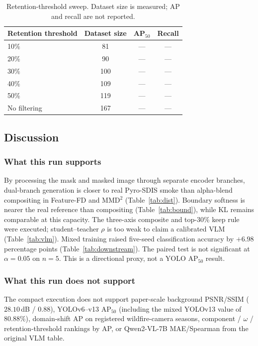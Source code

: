 \begin{table}[!t]
\centering
\caption{Retention-threshold sweep. Dataset size is measured; AP and
recall are not reported.}
\label{tab:filter}
\begin{tabular}{lccc}
\hline
Retention threshold & Dataset size & AP\(_{50}\) & Recall \\
\hline
10\% & 81 & --- & --- \\
20\% & 90 & --- & --- \\
30\% & 100 & --- & --- \\
40\% & 109 & --- & --- \\
50\% & 119 & --- & --- \\
No filtering & 167 & --- & --- \\
\hline
\end{tabular}
\end{table}

\subsection{Discussion}
\label{sec:results-disc}

\subsubsection{What this run supports}
By processing the mask and masked image through separate encoder
branches, dual-branch generation is closer to real Pyro-SDIS smoke than
alpha-blend compositing in Feature-FD and MMD\(^2\)
(Table~\ref{tab:dist}). Boundary softness is nearer the real reference
than compositing (Table~\ref{tab:bound}), while KL remains comparable at
this capacity. The three-axis composite and top-30\% keep rule were
executed; student--teacher \(\rho\) is too weak to claim a calibrated VLM
(Table~\ref{tab:vlm}). Mixed training raised five-seed classification
accuracy by \(+6.98\) percentage points (Table~\ref{tab:downstream}). The
paired test is not significant at \(\alpha=0.05\) on \(n=5\). This is a
directional proxy, not a YOLO \(\mathrm{AP}_{50}\) result.

\subsubsection{What this run does not support}
The compact execution does not support paper-scale background PSNR/SSIM
(\(28.10\)\,dB / \(0.88\)), YOLOv6--v13 \(\mathrm{AP}_{50}\) (including
the mixed YOLOv13 value of \(80.88\%\)), domain-shift AP on registered
wildfire-camera seasons, component / \(\omega\) / retention-threshold
rankings by AP, or Qwen2-VL-7B MAE/Spearman from the original VLM table.

